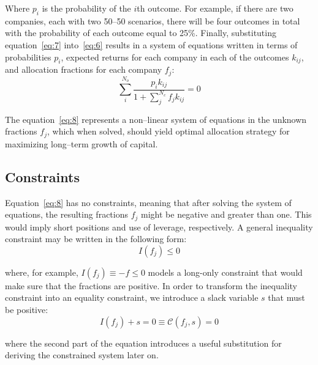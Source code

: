 \documentclass{article}
\begin{document}
\noindent Where $p_i$ is the probability of the $i$th outcome. For example, if
there are two companies, each with two 50--50 scenarios, there will be four
outcomes in total with the probability of each outcome equal to 25\%. Finally,
substituting equation~\eqref{eq:7} into~\eqref{eq:6} results in a system of
equations written in terms of probabilities $p_i$, expected returns for each
company in each of the outcomes $k_{ij}$, and allocation fractions for each
company $f_j$:
\begin{equation}
\label{eq:8}
    \sum_{i}^{N_o} \frac{p_i k_{ij}}{1 + \sum_{j}^{N_c} f_j k_{ij}} = 0
\end{equation}

\noindent The equation~\eqref{eq:8} represents a non--linear system of equations
in the unknown fractions $f_j$, which when solved, should yield optimal
allocation strategy for maximizing long--term growth of capital.

\subsection{Constraints}
\label{sec:constraints}

\noindent Equation~\eqref{eq:8} has no constraints, meaning that after solving
the system of equations, the resulting fractions $f_j$ might be negative and
greater than one. This would imply short positions and use of leverage,
respectively. A general inequality constraint may be written in the following
form:
\begin{equation}
\label{eq:9}
    I(f_j) \le 0
\end{equation}

\noindent where, for example, $I(f_j) \equiv -f \le 0$ models a long-only
constraint that would make sure that the fractions are positive. In order to
transform the inequality constraint into an equality constraint, we introduce a
slack variable $s$ that must be positive:
\begin{equation}
\label{eq:10}
    I(f_j) + s = 0 \equiv \mathcal{C}(f_j, s) = 0
\end{equation}

\noindent where the second part of the equation introduces a useful substitution
for deriving the constrained system later on.\\
\end{document}
